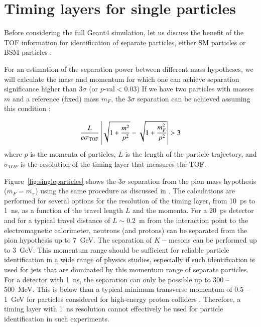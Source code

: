 \section{Timing layers for single particles}

Before considering the full Geant4 simulation, let us discuss the benefit of the TOF information
for identification of separate particles, either SM particles or BSM particles . 

For an estimation of the separation power between different mass hypotheses, we will
calculate the mass and momentum for which one can achieve separation significance higher than $3\sigma$ (or $p$-val$<0.03$)
If we have two particles with masses $m$ and a reference (fixed) mass $m_F$, the $3\sigma$ separation can be 
achieved assuming this condition  \cite{Cerri:2018rkm}:

\begin{equation}
\frac{L}{c \sigma_{\textsc{TOF}}}\left|\sqrt{1+\frac{m^2}{p^2}} - \sqrt{1+\frac{m_F^2}{p^2}}\right| > 3
\label{eqTOF}
\end{equation}
where $p$ is the momenta of particles, $L$  is the length of the particle trajectory, and $\sigma_{TOF}$ is the
resolution  of the timing layer that measures the TOF.

Figure~\ref{fig:singleparticles} shows the $3\sigma$ separation from the pion
mass hypothesis ($m_F=m_{\pi}$) using the same procedure as discussed  in \cite{Cerri:2018rkm}. The 
calculations are performed for several options for the resolution of the timing layer, from 10~ps to 1~ns,
as a function of the travel length $L$ and the momenta. For a 20~ps detector and  for a typical travel 
distance of $L\sim 0.2$~m from the interaction point to the 
electromagnetic calorimeter, neutrons (and protons) can be separated from the pion hypothesis up to 7~GeV. The separation of $K-$mesons can be performed up to 3~GeV.
This momentum range should be sufficient for reliable particle identification in a wide range 
of physics studies, especially if such identification is used for jets that are dominated
by this momentum range of separate particles.
For a detector  with 1~ns, the separation can only be possible  up to  300 -- 500~MeV. This is below  than a typical
minimum transverse momentum of 0.5 -- 1~GeV for particles considered for high-energy proton colliders .
Therefore, a timing layer with 1~ns resolution cannot effectively be used for particle identification in such experiments.

